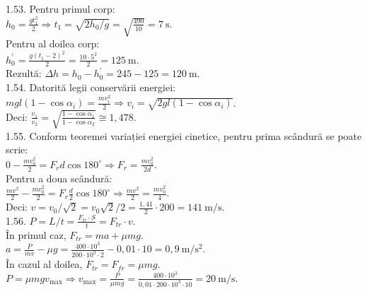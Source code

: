 1.53. Pentru primul corp:\\ $h_{0}=\frac{g t_{1}^{2}}{2} \Rightarrow t_{1}=\sqrt{2 h_{0} / g}=\sqrt{\frac{490}{10}}=7 \mathrm{~s}$.\\ Pentru al doilea corp:\\ $h_{0}^{\prime}=\frac{g\left(t_{1}-2\right)^{2}}{2}=\frac{10 \cdot 5^{2}}{2}=125 \mathrm{~m}$.\\ Rezultă: $\Delta h=h_{0}-h_{0}^{\prime}=245-125=120 \mathrm{~m}$.\\

1.54. Datorită legii conservării energiei:\\ $m g l\left(1-\cos \alpha_{i}\right)=\frac{m v_{i}^{2}}{2} \Rightarrow v_{i}=\sqrt{2 g l\left(1-\cos \alpha_{i}\right)}$.\\ Deci: $\frac{v_{1}}{v_{2}}=\sqrt{\frac{1-\cos \alpha_{1}}{1-\cos \alpha_{2}}} \cong 1,478$.\\

1.55. Conform teoremei variației energiei cinetice, pentru prima scândură se poate scrie:\\ $0-\frac{m v_{0}^{2}}{2}=F_{r} d \cos 180^{\circ} \Rightarrow F_{r}=\frac{m v_{0}^{2}}{2 d}$.\\ Pentru a doua scândură:\\ $\frac{m v^{2}}{2}-\frac{m v_{0}^{2}}{2}=F_{r} \frac{d}{2} \cos 180^{\circ} \Rightarrow \frac{m v^{2}}{2}=\frac{m v_{0}^{2}}{4}$.\\ Deci: $v=v_{0} / \sqrt{2}=v_{0} \sqrt{2} / 2=\frac{1,41}{2} \cdot 200=141 \mathrm{~m} / \mathrm{s}$.\\

1.56. $P=L / t=\frac{F_{t r} \cdot S}{t}=F_{t r} \cdot v$.\\ În primul caz, $F_{t r}=m a+\mu m g$.\\ $a=\frac{P}{m v}-\mu g=\frac{400 \cdot 10^{3}}{200 \cdot 10^{3} \cdot 2}-0,01 \cdot 10=0,9 \mathrm{~m} / \mathrm{s}^{2}$.\\ În cazul al doilea, $F_{t r}=F_{f r}=\mu m g$.\\ $P=\mu m g v_{\max } \Rightarrow v_{\max }=\frac{P}{\mu m g}=\frac{400 \cdot 10^{3}}{0,01 \cdot 200 \cdot 10^{3} \cdot 10}=20 \mathrm{~m} / \mathrm{s}$.\\

